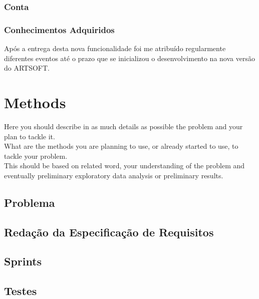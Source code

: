 \documentclass[sigplan]{acmart}
\begin{document}
\subsubsection{Conta}

\subsubsection{Conhecimentos Adquiridos}

 Após a entrega desta nova funcionalidade foi me atribuído regularmente diferentes eventos até o prazo que se inicializou o desenvolvimento na nova versão do ARTSOFT.

\section{Methods} \label{sec:methods}

Here you should describe in as much details as possible the problem and your plan to tackle it. \\

What are the methods you are planning to use, or already started to use, to tackle your problem. \\

This should be based on related word, your understanding of the problem and eventually preliminary exploratory data analysis or preliminary results.

\subsection{Problema} %

\subsection{Redação da Especificação de Requisitos}

\subsection{Sprints}

\subsection{Testes}
\end{document}
